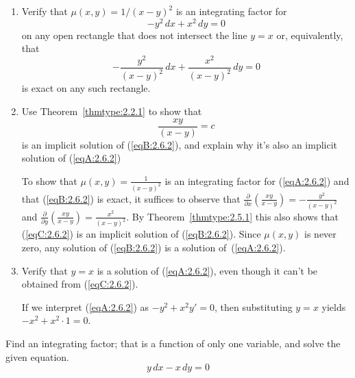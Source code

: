 \documentclass{ximera}
\begin{document}
\begin{problem}\label{exer:2.6.2}
\begin{enumerate}
\item %
Verify that $\mu(x,y)=1/(x-y)^2$ is an integrating factor for
\begin{equation}\label{eqA:2.6.2}
-y^2\,dx+x^2\,dy=0
\end{equation}
on any open rectangle  that does not intersect the line $y=x$
or, equivalently, that
\begin{equation}\label{eqB:2.6.2}
-\frac{y^2}{(x-y)^2}\,dx+\frac{x^2}{(x-y)^2}\,dy=0
\end{equation}
is exact on any such rectangle.
\item %
Use Theorem~\ref{thmtype:2.2.1} to show that
\begin{equation}\label{eqC:2.6.2}
\frac{xy}{(x-y)}=c
\end{equation}
is an implicit solution of (\ref{eqB:2.6.2}), and explain why
it's also an implicit solution of (\ref{eqA:2.6.2})



\begin{solution}
    To show that $\mu(x,y)=\frac{1}{(x-y)^2}$
is an integrating
factor for (\ref{eqA:2.6.2}) and that (\ref{eqB:2.6.2}) is exact, it suffices to observe that
$\frac{\partial }{\partial x}\left(\frac{xy}{ x-y}\right)=-
\frac{y^2}{(x-y)^2}$ and
$\frac{\partial }{\partial y}\left(\frac{xy}{ x-y}\right)=
\frac{x^2}{(x-y)^2}$. By Theorem~\ref{thmtype:2.5.1} this also shows that
(\ref{eqC:2.6.2}) is an implicit solution of (\ref{eqB:2.6.2}). Since
$\mu(x,y)$ is never zero, any solution of (\ref{eqB:2.6.2})  is a solution of~(\ref{eqA:2.6.2}).
\end{solution}

\item %
Verify that $y=x$  is a solution of  (\ref{eqA:2.6.2}),
even though it can't be obtained from  (\ref{eqC:2.6.2}).



\begin{solution}
    If we interpret (\ref{eqA:2.6.2}) as $-y^2+x^2y'=0$, then substituting
$y=x$ yields $-x^2+x^2\cdot1=0$.
\end{solution}
\end{enumerate}
\end{problem}

\begin{problem}\label{exer:2.6.3} Find an integrating factor; that is a function of only one variable, and solve the given equation.
$$y\,dx-x\,dy=0$$
\end{problem}
\end{document}
